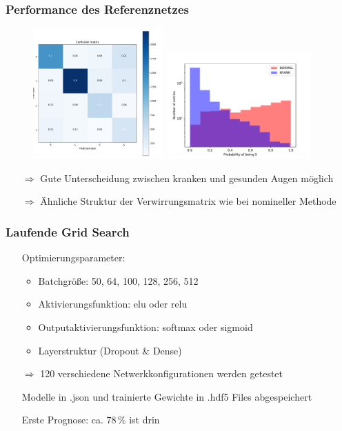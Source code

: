 \documentclass[aspectratio=1610, professionalfonts, 9pt]{beamer}
\begin{document}
\begin{frame}
 \frametitle{Performance des Referenznetzes}

 \begin{figure}
  \centering
  \includegraphics[width=5cm]{images/confusion_matrix_scan_new.pdf}\hspace{0.5cm}
  \includegraphics[width=5.5cm]{images/ill_or_not_scan_new.pdf}
 \end{figure}
\begin{itemize}
 \item[$\Rightarrow$] Gute Unterscheidung zwischen kranken und gesunden Augen möglich
 \item[$\Rightarrow$] Ähnliche Struktur der Verwirrungsmatrix wie bei nomineller Methode
\end{itemize}


\end{frame}


\begin{frame}
 \frametitle{Laufende Grid Search}
 \begin{itemize}
  \item[\textbullet] Optimierungsparameter:
  \begin{itemize}
   \item Batchgröße: 50, 64, 100, 128, 256, 512
   \item Aktivierungsfunktion: elu oder relu
   \item Outputaktivierungsfunktion: softmax oder sigmoid
   \item Layerstruktur (Dropout \& Dense)
  \end{itemize}
  \item[$\Rightarrow$] 120 verschiedene Netwerkkonfigurationen werden getestet
  \item[\textbullet] Modelle in .json und trainierte Gewichte in .hdf5 Files abgespeichert
  \vspace{0.5cm}
 \item[\textbullet] Erste Prognose: ca. $78\,\%$ ist drin
 \end{itemize}
\end{frame}
\end{document}
